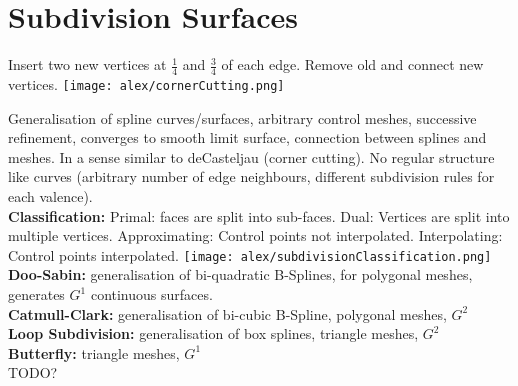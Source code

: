 \section{Subdivision Surfaces}

 Insert two new vertices at $\frac{1}{4}$ and $\frac{3}{4}$ of each edge. Remove old and connect new vertices.
\texttt{[image: alex/cornerCutting.png]}

 Generalisation of spline curves/surfaces, arbitrary control meshes, successive refinement, converges to smooth limit surface, connection between splines and meshes. In a sense similar to deCasteljau (corner cutting). No regular structure like curves (arbitrary number of edge neighbours, different subdivision rules for each valence). \\
\textbf{Classification:} Primal: faces are split into sub-faces. Dual: Vertices are split into multiple vertices. Approximating: Control points not interpolated. Interpolating: Control points interpolated.
\texttt{[image: alex/subdivisionClassification.png]}
\textbf{Doo-Sabin:} generalisation of bi-quadratic B-Splines, for polygonal meshes, generates $G^1$ continuous surfaces.\\
\textbf{Catmull-Clark:} generalisation of bi-cubic B-Spline, polygonal meshes, $G^2$\\
\textbf{Loop Subdivision:} generalisation of box splines, triangle meshes, $G^2$\\
\textbf{Butterfly:} triangle meshes, $G^1$\\

 TODO?

